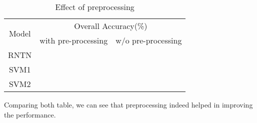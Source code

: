\begin{table}[H]
  \begin{center}
    \begin{tabular}{ccc}\hline
      \multirow{2}{*}{Model} 
      & \multicolumn{2}{c}{Overall Accuracy(\%)} \\\cline{2-3}
    & with pre-processing & w/o pre-processing \\ \hline
    RNTN  &          &     	       \\ 
    SVM1  & ~        &              \\ 
    SVM2  & ~        &              \\ \hline
    \end{tabular}
    \end{center}
    \caption{\label{exp5_3} Effect of preprocessing}
\end{table}

Comparing both table, we can see that preprocessing indeed helped in improving the performance.  

